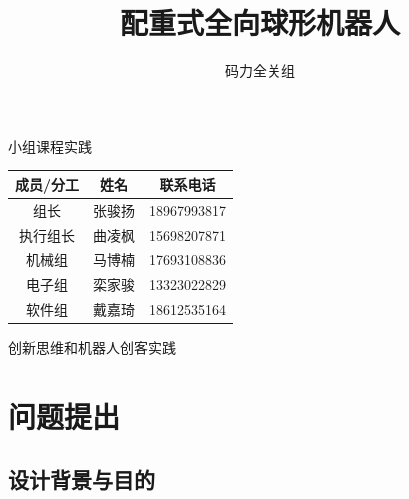\documentclass[a4paper]{ctexart}
\title{配重式全向球形机器人}
\author{码力全关组}
\numberwithin{equation}{section}
\numberwithin{table}{section}
\numberwithin{figure}{section}
\begin{document}


\begin{titlepage}

  \maketitle
  \begin{center}
    小组课程实践
  \end{center}


  \begin{center}
  \begin{tabular}[]{ccc}
  \toprule
  成员/分工 & 姓名 & 联系电话\\
  \midrule
  组长 & 张骏扬 & 18967993817 \\
  执行组长 & 曲凌枫 & 15698207871 \\
  机械组 & 马博楠 & 17693108836 \\
  电子组 & 栾家骏 & 13323022829 \\
  软件组 & 戴嘉琦 & 18612535164 \\
  \bottomrule
  \end{tabular}
\end{center}
  \addtocounter{table}{-1}

  
\begin{center}
  创新思维和机器人创客实践
\end{center}

\thispagestyle{empty}

\end{titlepage}

\addtocounter{page}{-2}

\newpage

\thispagestyle{fancy}
\lhead{}
\chead{\it\small{\textcolor{grey}{目录}}}
\rhead{}
\cfoot{}

\tableofcontents

\newpage


\pagestyle{fancy}
\fancyhead[RE, LO]{\it\small\rightmark}
\fancyhead[C]{\small{\it\textcolor{grey}{配重式球形机器人}}}

\section{问题提出}

\subsection{设计背景与目的}
\end{document}
